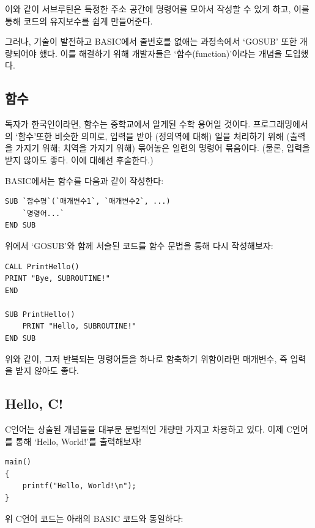 \documentclass[a4paper,12pt]{book}
\begin{document}
이와 같이 서브루틴은 특정한 주소 공간에 명령어를 모아서 작성할 수 있게 하고,
이를 통해 코드의 유지보수를 쉽게 만들어준다.

그러나, 기술이 발전하고 BASIC에서 줄번호를 없애는 과정속에서 `GOSUB' 또한 개량되어야 했다.
이를 해결하기 위해 개발자들은 `함수(function)'이라는 개념을 도입했다.


\subsection{함수}

독자가 한국인이라면, 함수는 중학교에서 알게된 수학 용어일 것이다.
프로그래밍에서의 `함수'또한 비슷한 의미로,
입력을 받아 (정의역에 대해) 일을 처리하기 위해 (출력을 가지기 위해; 치역을 가지기 위해)
묶어놓은 일련의 명령어 묶음이다. (물론, 입력을 받지 않아도 좋다. 이에 대해선 후술한다.)

BASIC에서는 함수를 다음과 같이 작성한다:

\begin{lstlisting}[escapeinside=``]
SUB `함수명`(`매개변수1`, `매개변수2`, ...)
    `명령어...`
END SUB
\end{lstlisting}

위에서 `GOSUB'와 함께 서술된 코드를 함수 문법을 통해 다시 작성해보자:

\begin{lstlisting}
CALL PrintHello()
PRINT "Bye, SUBROUTINE!"
END

SUB PrintHello()
    PRINT "Hello, SUBROUTINE!"
END SUB
\end{lstlisting}

위와 같이, 그저 반복되는 명령어들을 하나로 함축하기 위함이라면 매개변수,
즉 입력을 받지 않아도 좋다.


\subsection{Hello, C!}
\label{sec:hello-c}

C언어는 상술된 개념들을 대부분 문법적인 개량만 가지고 차용하고 있다.
이제 C언어를 통해 `Hello, World!'를 출력해보자!


\begin{lstlisting}
main()
{
    printf("Hello, World!\n");
}
\end{lstlisting}

위 C언어 코드는 아래의 BASIC 코드와 동일하다:
\end{document}
